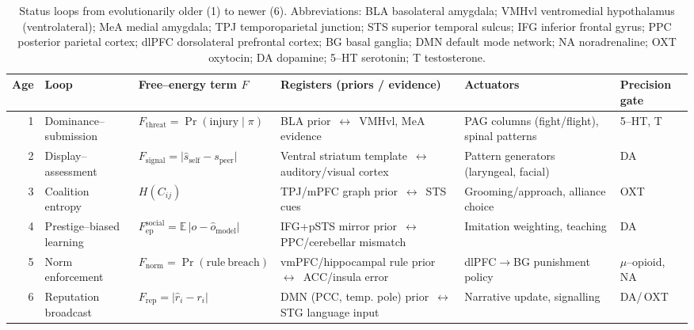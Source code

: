 \documentclass[11pt]{article}
\begin{document}
\begin{table}[h]
\small
\centering
\begin{tabular}{@{}r p{2.6cm} p{3.6cm} p{3.6cm} p{2.1cm} p{1.9cm}@{}}
\toprule
Age & Loop & Free--energy term $F$ & Registers (priors / evidence) & Actuators & Precision gate \\
\midrule
1 & Dominance--submission & $F_{\mathrm{threat}}=\Pr(\mathrm{injury}\mid \pi)$ & BLA prior \,$\leftrightarrow$\, VMHvl, MeA evidence & PAG columns (fight/flight), spinal patterns & 5--HT, T \cite{Lin2011,Raleigh1991} \\
2 & Display--assessment & $F_{\mathrm{signal}}=\lvert\hat s_{\mathrm{self}}-s_{\mathrm{peer}}\rvert$ & Ventral striatum template \,$\leftrightarrow$\, auditory/visual cortex & Pattern generators (laryngeal, facial) & DA \cite{Schultz1997} \\
3 & Coalition entropy & $H(C_{ij})$ & TPJ/mPFC graph prior \,$\leftrightarrow$\, STS cues & Grooming/approach, alliance choice & OXT \cite{Scholz2016,Kosfeld2005} \\
4 & Prestige--biased learning & $F_{\mathrm{ep}}^{\mathrm{social}}=\mathbb E\,\lvert o-\hat o_{\mathrm{model}}\rvert$ & IFG+pSTS mirror prior \,$\leftrightarrow$\, PPC/cerebellar mismatch & Imitation weighting, teaching & DA \cite{Rizzolatti2004,Chudek2011} \\
5 & Norm enforcement & $F_{\mathrm{norm}}=\Pr(\mathrm{rule\ breach})$ & vmPFC/hippocampal rule prior \,$\leftrightarrow$\, ACC/insula error & dlPFC$\to$BG punishment policy & $\mu$--opioid, NA \cite{Fehr2002,Knoch2006,Eisenberger2003} \\
6 & Reputation broadcast & $F_{\mathrm{rep}}=\lvert \hat r_i-r_i\rvert$ & DMN (PCC, temp. pole) prior \,$\leftrightarrow$\, STG language input & Narrative update, signalling & DA/\,OXT \cite{Zink2008,HenrichGilWhite2001} \\
\bottomrule
\end{tabular}
\caption{Status loops from evolutionarily older (1) to newer (6). Abbreviations: BLA basolateral amygdala; VMHvl ventromedial hypothalamus (ventrolateral); MeA medial amygdala; TPJ temporoparietal junction; STS superior temporal sulcus; IFG inferior frontal gyrus; PPC posterior parietal cortex; dlPFC dorsolateral prefrontal cortex; BG basal ganglia; DMN default mode network; NA noradrenaline; OXT oxytocin; DA dopamine; 5--HT serotonin; T testosterone.}
\label{tab:ledger}
\end{table}
\end{document}
